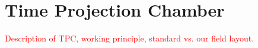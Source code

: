 \chapter{Time Projection Chamber}
\label{sec:tpc}
	\textcolor{red}{Description of TPC, working principle, standard vs. our field layout.}